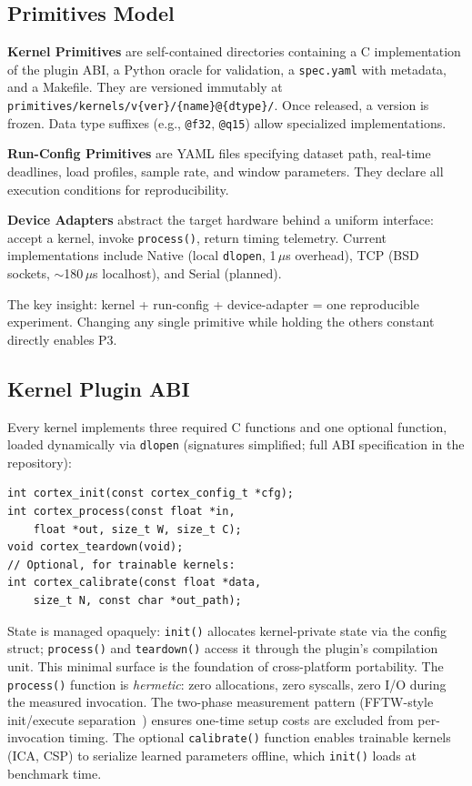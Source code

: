 \documentclass[sigplan,10pt]{acmart}
\begin{document}
\subsection{Primitives Model}

\textbf{Kernel Primitives} are self-contained directories containing a C implementation of the plugin ABI, a Python oracle for validation, a \texttt{spec.yaml} with metadata, and a Makefile. They are versioned immutably at \texttt{primitives/kernels/v\{ver\}/\{name\}@\{dtype\}/}. Once released, a version is frozen. Data type suffixes (e.g., \texttt{@f32}, \texttt{@q15}) allow specialized implementations.

\textbf{Run-Config Primitives} are YAML files specifying dataset path, real-time deadlines, load profiles, sample rate, and window parameters. They declare all execution conditions for reproducibility.

\textbf{Device Adapters} abstract the target hardware behind a uniform interface: accept a kernel, invoke \texttt{process()}, return timing telemetry. Current implementations include Native (local \texttt{dlopen}, 1\,$\mu$s overhead), TCP (BSD sockets, $\sim$180\,$\mu$s localhost), and Serial (planned).

The key insight: kernel + run-config + device-adapter = one reproducible experiment. Changing any single primitive while holding the others constant directly enables P3.

\subsection{Kernel Plugin ABI}

Every kernel implements three required C functions and one optional function, loaded dynamically via \texttt{dlopen} (signatures simplified; full ABI specification in the repository):

{\small
\begin{verbatim}
int cortex_init(const cortex_config_t *cfg);
int cortex_process(const float *in,
    float *out, size_t W, size_t C);
void cortex_teardown(void);
// Optional, for trainable kernels:
int cortex_calibrate(const float *data,
    size_t N, const char *out_path);
\end{verbatim}
}

\noindent State is managed opaquely: \texttt{init()} allocates kernel-private state via the config struct; \texttt{process()} and \texttt{teardown()} access it through the plugin's compilation unit. This minimal surface is the foundation of cross-platform portability. The \texttt{process()} function is \emph{hermetic}: zero allocations, zero syscalls, zero I/O during the measured invocation. The two-phase measurement pattern (FFTW-style init/execute separation~\cite{frigo2005fftw}) ensures one-time setup costs are excluded from per-invocation timing. The optional \texttt{calibrate()} function enables trainable kernels (ICA, CSP) to serialize learned parameters offline, which \texttt{init()} loads at benchmark time.
\end{document}

